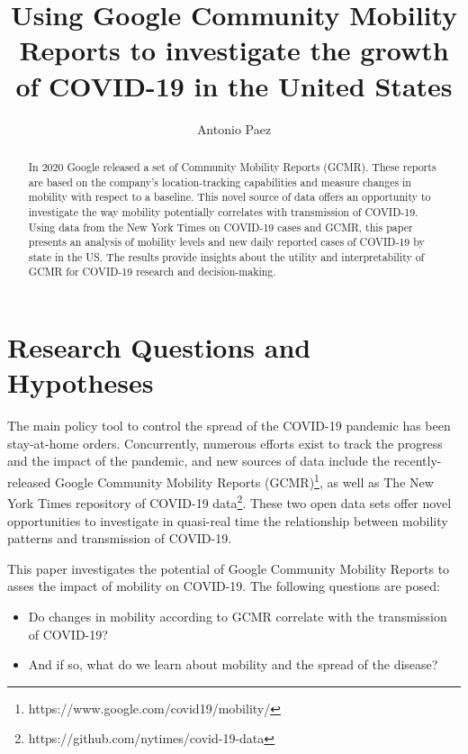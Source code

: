 \documentclass[]{elsarticle} %
\providecommand{\tightlist}{%
  \setlength{\itemsep}{0pt}\setlength{\parskip}{0pt}}
\begin{document}
\begin{frontmatter}

  \title{Using Google Community Mobility Reports to investigate the growth of
COVID-19 in the United States}
    \author[McMaster University]{Antonio Paez}
      \address[McMaster University]{School of Geography and Earth Sciences, McMaster University, Hamilton,
ON, L8S 4K1, Canada}
  
  \begin{abstract}
  In 2020 Google released a set of Community Mobility Reports (GCMR).
  These reports are based on the company's location-tracking capabilities
  and measure changes in mobility with respect to a baseline. This novel
  source of data offers an opportunity to investigate the way mobility
  potentially correlates with transmission of COVID-19. Using data from
  the New York Times on COVID-19 cases and GCMR, this paper presents an
  analysis of mobility levels and new daily reported cases of COVID-19 by
  state in the US. The results provide insights about the utility and
  interpretability of GCMR for COVID-19 research and decision-making.
  \end{abstract}
  
 \end{frontmatter}

\hypertarget{research-questions-and-hypotheses}{%
\section{Research Questions and
Hypotheses}\label{research-questions-and-hypotheses}}

The main policy tool to control the spread of the COVID-19 pandemic has
been stay-at-home orders. Concurrently, numerous efforts exist to track
the progress and the impact of the pandemic, and new sources of data
include the recently-released Google Community Mobility Reports
(GCMR)\footnote{https://www.google.com/covid19/mobility/}, as well as
The New York Times repository of COVID-19
data\footnote{https://github.com/nytimes/covid-19-data}. These two open
data sets offer novel opportunities to investigate in quasi-real time
the relationship between mobility patterns and transmission of COVID-19.

This paper investigates the potential of Google Community Mobility
Reports to asses the impact of mobility on COVID-19. The following
questions are posed:

\begin{itemize}
\tightlist
\item
  Do changes in mobility according to GCMR correlate with the
  transmission of COVID-19?
\item
  And if so, what do we learn about mobility and the spread of the
  disease?
\end{itemize}
\end{document}
